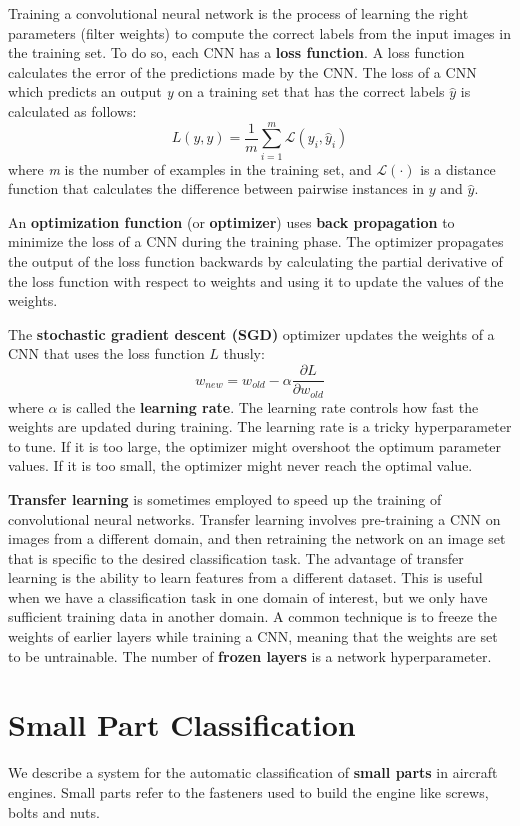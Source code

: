 Training a convolutional neural network is the process of learning the right parameters (filter weights) to compute the correct labels from the input images in the training set. To do so, each CNN has a \textbf{loss function}. A loss function calculates the error of the predictions made by the CNN. The loss of a CNN which predicts an output \textit{y} on a training set that has the correct labels $\hat{y}$ is calculated as follows: \[L(y, \hat{y}) = \dfrac{1}{m}\sum_{i=1}^m \mathscr{L}(y_i, \hat{y}_i)\] where \textit{m} is the number of examples in the training set, and $\mathscr{L}(\cdot)$ is a distance function that calculates the difference between pairwise instances in $y$ and $\hat{y}$.

An \textbf{optimization function} (or \textbf{optimizer}) uses \textbf{back propagation} \cite{lecun1989backpropagation} to minimize the loss of a CNN during the training phase. The optimizer propagates the output of the loss function backwards by calculating the partial derivative of the loss function with respect to weights and using it to update the values of the weights.

The \textbf{stochastic gradient descent (SGD)} optimizer updates the weights of a CNN that uses the loss function $L$ thusly: \[w_{new}=w_{old}-\alpha\dfrac{\partial L}{\partial w_{old}}\] where $\alpha$ is called the \textbf{learning rate}. The learning rate controls how fast the weights are updated during training. The learning rate is a tricky hyperparameter to tune. If it is too large, the optimizer might overshoot the optimum parameter values. If it is too small, the optimizer might never reach the optimal value.

\textbf{Transfer learning} \cite{pan2010survey} is sometimes employed to speed up the training of convolutional neural networks. Transfer learning involves pre-training a CNN on images from a different domain, and then retraining the network on an image set that is specific to the desired classification task. The advantage of transfer learning is the ability to learn features from a different dataset. This is useful when we have a classification task in one domain of interest, but we only have sufficient training data in another domain. A common technique is to freeze the weights of earlier layers while training a CNN, meaning that the weights are set to be untrainable. The number of \textbf{frozen layers} is a network hyperparameter.


\section{Small Part Classification}\label{sec:synth}
We describe a system for the automatic classification of \textbf{small parts} in aircraft engines. Small parts refer to the fasteners used to build the engine like screws, bolts and nuts.

